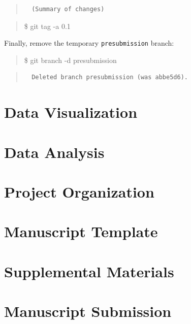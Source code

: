 \documentclass[]{book}
\begin{document}
\begin{quote}
\begin{verbatim}
  (Summary of changes)
\end{verbatim}
\end{quote}

\begin{quote}
\$ git tag -a 0.1
\end{quote}

Finally, remove the temporary \texttt{presubmission} branch:

\begin{quote}
\$ git branch -d presubmission
\end{quote}

\begin{quote}
\begin{verbatim}
  Deleted branch presubmission (was abbe5d6).
\end{verbatim}
\end{quote}

\chapter{Data Visualization}\label{data-visualization}

\chapter{Data Analysis}\label{data-analysis}

\chapter{Project Organization}\label{project-organization}

\chapter{Manuscript Template}\label{manuscript-template}

\chapter{Supplemental Materials}\label{supplemental-materials}

\chapter{Manuscript Submission}\label{manuscript-submission}


\end{document}
